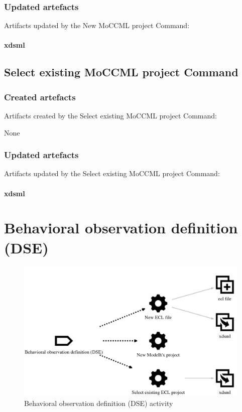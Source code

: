 \documentclass{gemoc} %
\begin{document}
\subsubsection{Updated artefacts}
Artifacts updated by the New MoCCML project Command:
\paragraph{xdsml} 


\subsection{Select existing MoCCML project Command}

\subsubsection{Created artefacts}
Artifacts created by the Select existing MoCCML project Command:

	None
\subsubsection{Updated artefacts}
Artifacts updated by the Select existing MoCCML project Command:
\paragraph{xdsml} 


\section{Behavioral observation definition (DSE)}
\label{sec:Behavioral_observation_definition__DSE_}
\begin{figure}[h!]
		\center
		\includegraphics*[trim=0.0cm 0.0cm 0cm 0.0cm, clip=true]{fig/Behavioral_observation_definition__DSE_}
		\caption{Behavioral observation definition (DSE) activity}
		\label{fig:Behavioral_observation_definition__DSE_}
\end{figure}
\end{document}
